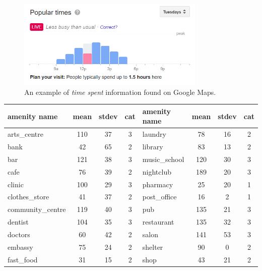 	\begin{figure}[!ht]
		\centering
		\includegraphics[width=0.8\textwidth]{graphics/google_visit_duration.png}
		\caption{An example of \textit{time spent} information found on Google Maps.}
		\label{fig:visit_duration}
	\end{figure}
	
	\begin{table}[!ht]
		{\begin{tabular}{ | l | c | c | c || l | c | c | c |}
				\hline		
				\textbf{amenity name} & \textbf{mean} & \textbf{stdev} & \textbf{cat} & \textbf{amenity name} & \textbf{mean} & \textbf{stdev} & \textbf{cat} \\ \hline
				arts\_centre  & 110 & 37 & 3 & laundry  & 78 & 16 & 2 \\ \hline
				bank  & 42 & 65 & 2 &  library  & 83 & 13 & 2 \\ \hline
				bar  & 121 & 38 & 3 &  music\_school  & 120 & 30 & 3 \\ \hline
				cafe  & 76 & 39 & 2 &  nightclub  & 189 & 20 & 3 \\ \hline
				clinic  & 100 & 29 & 3 &  pharmacy  & 25 & 20 & 1 \\ \hline
				clothes\_store  & 41 & 37 & 2 &  post\_office  & 16 & 2 & 1 \\ \hline
				community\_centre  & 119 & 40 & 3 &  pub  & 135 & 21 & 3 \\ \hline
				dentist  & 104 & 35 & 3 &  restaurant  & 135 & 32 & 3 \\ \hline
				doctors  & 60 & 42 & 2 &  salon  & 141 & 53 & 3 \\ \hline
				embassy  & 75 & 24 & 2 &  shelter  & 90 & 0 & 2 \\ \hline
				fast\_food  & 31 & 15 & 2 &  shop  & 43 & 21 & 2 \\ \hline

\end{tabular}}
\end{table}
